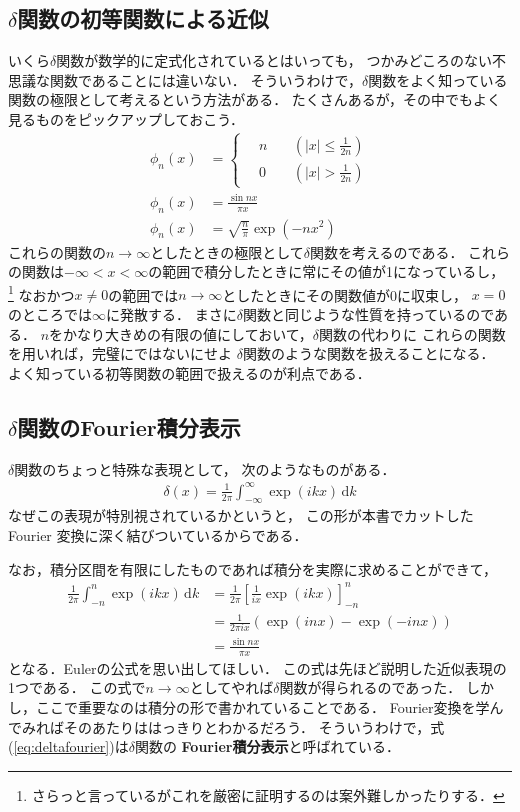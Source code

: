 \subsection{$\delta$関数の初等関数による近似}
いくら$\delta$関数が数学的に定式化されているとはいっても，
つかみどころのない不思議な関数であることには違いない．
そういうわけで，$\delta$関数をよく知っている関数の極限として考えるという方法がある．
たくさんあるが，その中でもよく見るものをピックアップしておこう．
\begin{align}
\phi_n (x) & = \left \{
\begin{aligned}
& \, n \quad & \left( \lvert x \rvert \leq \frac{1}{2n} \right) \\
& \, 0 \quad & \left( \lvert x \rvert > \frac{1}{2n} \right) 
\end{aligned}
\right. \\
\phi_n(x) & = \frac{ \sin nx}{\pi x} \\
\phi_n(x) & = \sqrt{ \frac{ n}{\pi}} \exp ( - nx^2)
\end{align}
これらの関数の$n \to \infty$としたときの極限として$\delta$関数を考えるのである．
これらの関数は$- \infty < x < \infty$の範囲で積分したときに常にその値が1になっているし，
\footnote{さらっと言っているがこれを厳密に証明するのは案外難しかったりする．}
なおかつ$x \neq 0$の範囲では$n \to \infty$としたときにその関数値が0に収束し，
$x = 0$のところでは$\infty$に発散する．
まさに$\delta$関数と同じような性質を持っているのである．
$n$をかなり大きめの有限の値にしておいて，$\delta$関数の代わりに
これらの関数を用いれば，完璧にではないにせよ
$\delta$関数のような関数を扱えることになる．
よく知っている初等関数の範囲で扱えるのが利点である．

\subsection{$\delta$関数の\textrm{Fourier}積分表示}
$\delta$関数のちょっと特殊な表現として，
次のようなものがある．
\begin{align}
\delta ( x ) = \frac{1}{2\pi} \int_{-\infty}^{\infty} \exp ( ikx) \, \mathrm{d}k
\label{eq:deltafourier}
\end{align}
なぜこの表現が特別視されているかというと，
この形が本書でカットしたFourier
変換に深く結びついているからである．

なお，積分区間を有限にしたものであれば積分を実際に求めることができて，
\begin{align*}
\frac{1}{2\pi} \int_{-n}^{n} \exp ( ikx) \, \mathrm{d}k 
& = \frac{1}{2 \pi} \left[ \frac{1}{ix} \exp ( ikx) \right]_{-n}^n \\
& = \frac{1}{2 \pi ix} ( \exp ( inx ) - \exp( - inx) ) \\
& = \frac{ \sin nx} { \pi x}
\end{align*}
となる．Eulerの公式を思い出してほしい．
この式は先ほど説明した近似表現の1つである．
この式で$n \to \infty$としてやれば$\delta$関数が得られるのであった．
しかし，ここで重要なのは積分の形で書かれていることである．
Fourier変換を学んでみればそのあたりははっきりとわかるだろう．
そういうわけで，式(\ref{eq:deltafourier})は$\delta$関数の
\textbf{Fourier積分表示}と呼ばれている． 

